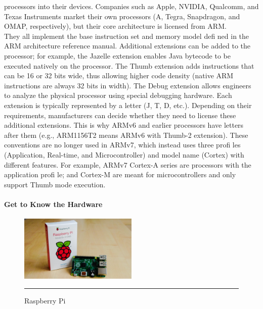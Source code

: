 processors into their devices. Companies such as Apple, NVIDIA, Qualcomm,
and Texas Instruments market their own processors (A, Tegra, Snapdragon, and OMAP, respectively), but their core architecture is licensed from ARM.\\
\-\hspace{1cm}They all implement the base instruction set and memory model defi ned in the
ARM architecture reference manual. Additional extensions can be added to
the processor; for example, the Jazelle extension enables Java bytecode to be
executed natively on the processor. The Thumb extension adds instructions
that can be 16 or 32 bits wide, thus allowing higher code density (native ARM
instructions are always 32 bits in width). The Debug extension allows engineers
to analyze the physical processor using special debugging hardware. Each
extension is typically represented by a letter (J, T, D, etc.). Depending on their
requirements, manufacturers can decide whether they need to license these
additional extensions. This is why ARMv6 and earlier processors have letters
after them (e.g., ARM1156T2 means ARMv6 with Thumb-2 extension). These
conventions are no longer used in ARMv7, which instead uses three profi les
(Application, Real-time, and Microcontroller) and model name (Cortex) with
different features. For example, ARMv7 Cortex-A series are processors with
the application profi le; and Cortex-M are meant for microcontrollers and only
support Thumb mode execution.

\paragraph*{Get to Know the Hardware}

\begin{figure}
\vspace{15pt}
  \begin{center}
    \includegraphics[width=0.5\textwidth]{./Pictures/unboxing_pi.jpg}
  \end{center}
  \rule{0.5\textwidth}{0.5pt}
  \caption{Raspberry Pi }
  \label{fig:unboxing_pi}
\end{figure}


